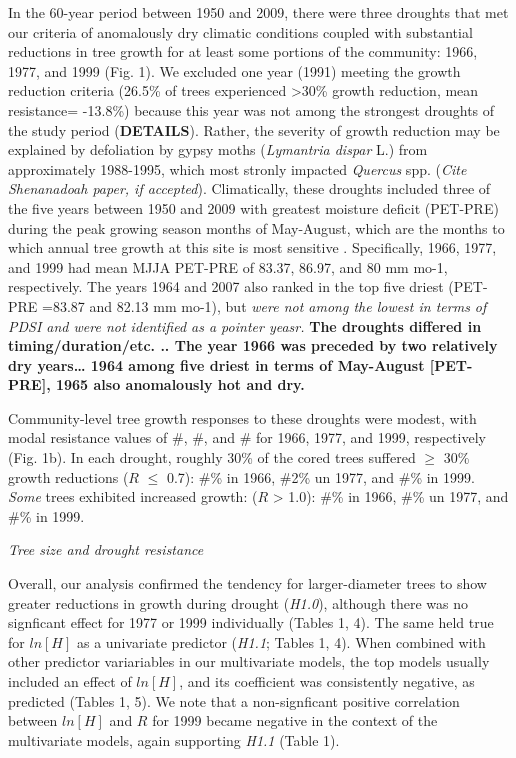 \documentclass[]{article}
\begin{document}
In the 60-year period between 1950 and 2009, there were three droughts
that met our criteria of anomalously dry climatic conditions coupled
with substantial reductions in tree growth for at least some portions of
the community: 1966, 1977, and 1999 (Fig. 1). We excluded one year
(1991) meeting the growth reduction criteria (26.5\% of trees
experienced \textgreater{}30\% growth reduction, mean resistance=
-13.8\%) because this year was not among the strongest droughts of the
study period (\textbf{DETAILS}). Rather, the severity of growth
reduction may be explained by defoliation by gypsy moths
(\emph{Lymantria dispar} L.) from approximately 1988-1995, which most
stronly impacted \emph{Quercus} spp. (\emph{Cite Shenanadoah paper, if
accepted}). Climatically, these droughts included three of the five
years between 1950 and 2009 with greatest moisture deficit (PET-PRE)
during the peak growing season months of May-August, which are the
months to which annual tree growth at this site is most sensitive
\citep{helcoski_growing_2019}. Specifically, 1966, 1977, and 1999 had
mean MJJA PET-PRE of 83.37, 86.97, and 80 mm mo-1, respectively. The
years 1964 and 2007 also ranked in the top five driest (PET-PRE =83.87
and 82.13 mm mo-1), but \emph{were not among the lowest in terms of PDSI
and were not identified as a pointer yeasr.} \textbf{The droughts
differed in timing/duration/etc. .. The year 1966 was preceded by two
relatively dry years\ldots{} 1964 among five driest in terms of
May-August {[}PET-PRE{]}, 1965 also anomalously hot and dry. }

Community-level tree growth responses to these droughts were modest,
with modal resistance values of \#, \#, and \# for 1966, 1977, and 1999,
respectively (Fig. 1b). In each drought, roughly 30\% of the cored trees
suffered \(\ge\) 30\% growth reductions (\(R\) \(\le\) 0.7): \#\% in
1966, \#2\% un 1977, and \#\% in 1999. \emph{Some} trees exhibited
increased growth: (\(R\) \textgreater{} 1.0): \#\% in 1966, \#\% un
1977, and \#\% in 1999.

\emph{Tree size and drought resistance}

Overall, our analysis confirmed the tendency for larger-diameter trees
to show greater reductions in growth during drought
\citep{bennett_larger_2015} (\emph{H1.0}), although there was no
signficant effect for 1977 or 1999 individually (Tables 1, 4). The same
held true for \(ln[H]\) as a univariate predictor (\emph{H1.1}; Tables
1, 4). When combined with other predictor variariables in our
multivariate models, the top models usually included an effect of
\(ln[H]\), and its coefficient was consistently negative, as predicted
(Tables 1, 5). We note that a non-signficant positive correlation
between \(ln[H]\) and \(R\) for 1999 became negative in the context of
the multivariate models, again supporting \emph{H1.1} (Table 1).
\end{document}
